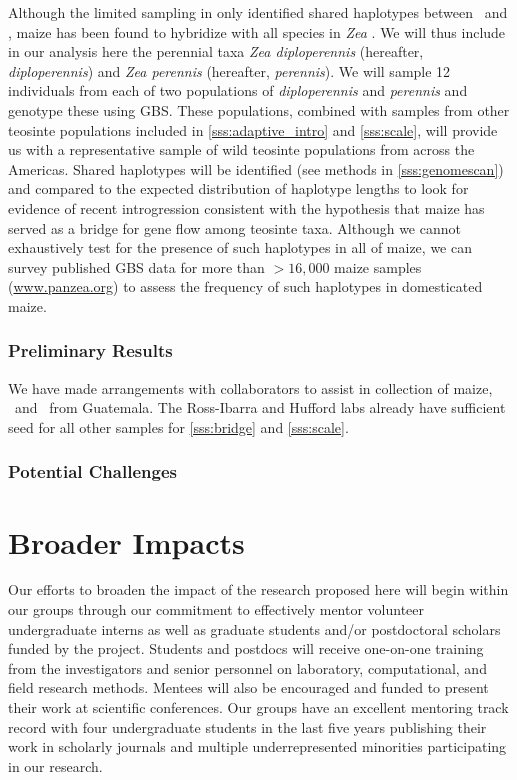 Although the limited sampling in \citet{Ross-Ibarra2009a} only identified shared haplotypes between \zm\ and \zl, maize has been found to hybridize with all species in \emph{Zea} \citep{Wilkes1977}.
We will thus include in our analysis here the perennial taxa \emph{Zea diploperennis} (hereafter, \emph{diploperennis}) and \emph{Zea perennis} (hereafter, \emph{perennis}).  
We will sample 12 individuals from each of two populations of \emph{diploperennis} and \emph{perennis} and genotype these using GBS.
These populations, combined with samples from other teosinte populations included in \ref{sss:adaptive_intro} and \ref{sss:scale}, will provide us with a representative sample of wild teosinte populations from across the Americas.
Shared haplotypes will be identified (see methods in \ref{sss:genomescan}) and compared to the expected distribution of haplotype lengths to look for evidence of recent introgression consistent with the hypothesis that maize has served as a bridge for gene flow among teosinte taxa.
Although we cannot exhaustively test for the presence of such haplotypes in all of maize, we can survey published GBS data for more than $>16,000$ maize samples (\url{www.panzea.org}) to assess the frequency of such haplotypes in domesticated maize.

\subsubsection{Preliminary Results}
We have made arrangements with collaborators to assist in collection of maize, \zl\ and \zh\ from Guatemala.  The Ross-Ibarra and Hufford labs already have sufficient seed for all other samples for \ref{sss:bridge} and \ref{sss:scale}.

\subsubsection{Potential Challenges}


\section*{Broader Impacts}

Our efforts to broaden the impact of the research proposed here will begin within our groups through our commitment to effectively mentor volunteer undergraduate interns as well as graduate students and/or postdoctoral scholars funded by the project. Students and postdocs will receive one-on-one training from the investigators and senior personnel on laboratory, computational, and field research methods.  Mentees will also be encouraged and funded to present their work at scientific conferences.  Our groups have an excellent mentoring track record with four undergraduate students in the last five years publishing their work in scholarly journals and multiple underrepresented minorities participating in our research.

